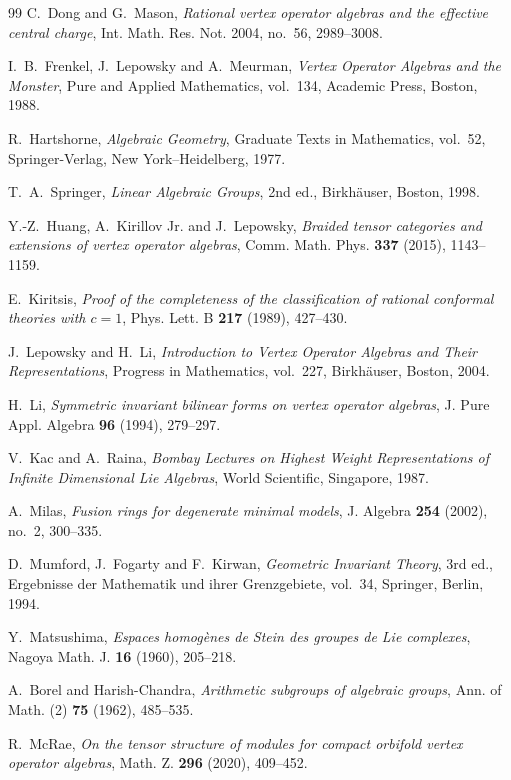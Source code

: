 \documentclass[12pt,leqno]{amsart}
\numberwithin{equation}{section} \newtheorem{thm}{Theorem}[section] \newtheorem{lem}[thm]{Lemma} \newtheorem{ex}[thm]{Example} \newtheorem{prop}[thm]{Proposition} \newtheorem{cor}[thm]{Corollary} \newtheorem{defi}[thm]{Definition} \newtheorem{rmk}[thm]{Remark} \newtheorem{notation}[thm]{Notation}
\begin{document}
\begin{thebibliography}{99}
C.~Dong and G.~Mason,
\emph{Rational vertex operator algebras and the effective central charge},
Int. Math. Res. Not. 2004, no.~56, 2989--3008.

I.~B.~Frenkel, J.~Lepowsky and A.~Meurman,
\emph{Vertex Operator Algebras and the Monster},
Pure and Applied Mathematics, vol.~134,
Academic Press, Boston, 1988.

R.~Hartshorne,
\emph{Algebraic Geometry},
Graduate Texts in Mathematics, vol.~52,
Springer-Verlag, New York--Heidelberg, 1977.

T.~A.~Springer,
\emph{Linear Algebraic Groups},
2nd ed., Birkh\"auser, Boston, 1998.

Y.-Z.~Huang, A.~Kirillov Jr. and J.~Lepowsky,
\emph{Braided tensor categories and extensions of vertex operator algebras},
Comm. Math. Phys. \textbf{337} (2015), 1143--1159.

E.~Kiritsis,
\emph{Proof of the completeness of the classification of rational conformal theories with $c=1$},
Phys. Lett. B \textbf{217} (1989), 427--430.

J.~Lepowsky and H.~Li,
\emph{Introduction to Vertex Operator Algebras and Their Representations},
Progress in Mathematics, vol.~227,
Birkh\"auser, Boston, 2004.

H.~Li,
\emph{Symmetric invariant bilinear forms on vertex operator algebras},
J. Pure Appl. Algebra \textbf{96} (1994), 279--297.

V.~Kac and A.~Raina,
\emph{Bombay Lectures on Highest Weight Representations of Infinite Dimensional Lie Algebras},
World Scientific, Singapore, 1987.

A.~Milas,
\emph{Fusion rings for degenerate minimal models},
J. Algebra \textbf{254} (2002), no.~2, 300--335.

D.~Mumford, J.~Fogarty and F.~Kirwan,
\emph{Geometric Invariant Theory},
3rd ed., Ergebnisse der Mathematik und ihrer Grenzgebiete, vol.~34,
Springer, Berlin, 1994.

Y.~Matsushima,
\emph{Espaces homog\`enes de Stein des groupes de Lie complexes},
Nagoya Math. J. \textbf{16} (1960), 205--218.

A.~Borel and Harish-Chandra,
\emph{Arithmetic subgroups of algebraic groups},
Ann. of Math. (2) \textbf{75} (1962), 485--535.

R.~McRae,
\emph{On the tensor structure of modules for compact orbifold vertex operator algebras},
Math. Z. \textbf{296} (2020), 409--452.


\end{thebibliography}
\end{document}
